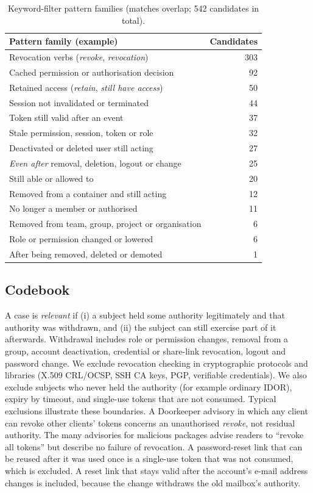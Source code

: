 \documentclass[preprint,12pt]{elsarticle}
\begin{document}
\begin{table}[t]
\centering\small
\caption{Keyword-filter pattern families (matches overlap; 542 candidates in total).}
\label{tab:filter}
\begin{tabular}{lr}
\toprule
Pattern family (example) & Candidates \\
\midrule
Revocation verbs (\emph{revoke}, \emph{revocation}) & 303 \\
Cached permission or authorisation decision & 92 \\
Retained access (\emph{retain}, \emph{still have access}) & 50 \\
Session not invalidated or terminated & 44 \\
Token still valid after an event & 37 \\
Stale permission, session, token or role & 32 \\
Deactivated or deleted user still acting & 27 \\
\emph{Even after} removal, deletion, logout or change & 25 \\
Still able or allowed to & 20 \\
Removed from a container and still acting & 12 \\
No longer a member or authorised & 11 \\
Removed from team, group, project or organisation & 6 \\
Role or permission changed or lowered & 6 \\
After being removed, deleted or demoted & 1 \\
\bottomrule
\end{tabular}
\end{table}


\subsection{Codebook}
A case is \emph{relevant} if (i) a subject held some authority legitimately and that authority was
withdrawn, and (ii) the subject can still exercise part of it afterwards. Withdrawal includes
role or permission changes, removal from a group, account deactivation, credential or share-link
revocation, logout and password change. We exclude revocation checking in cryptographic
protocols and libraries (X.509 CRL/OCSP, SSH CA keys, PGP, verifiable credentials). We also exclude subjects who
never held the authority (for example ordinary IDOR), expiry by timeout, and single-use tokens that are not
consumed.
Typical exclusions illustrate these boundaries. A Doorkeeper advisory in which any client can revoke other clients'
tokens concerns an unauthorised \emph{revoke}, not residual authority. The many advisories for malicious packages advise
readers to ``revoke all tokens'' but describe no failure of revocation. A password-reset link that can be reused
after it was used once is a single-use token that was not consumed, which is excluded. A reset link that stays valid after the
account's e-mail address changes is included, because the change withdraws the old mailbox's authority.
\end{document}
